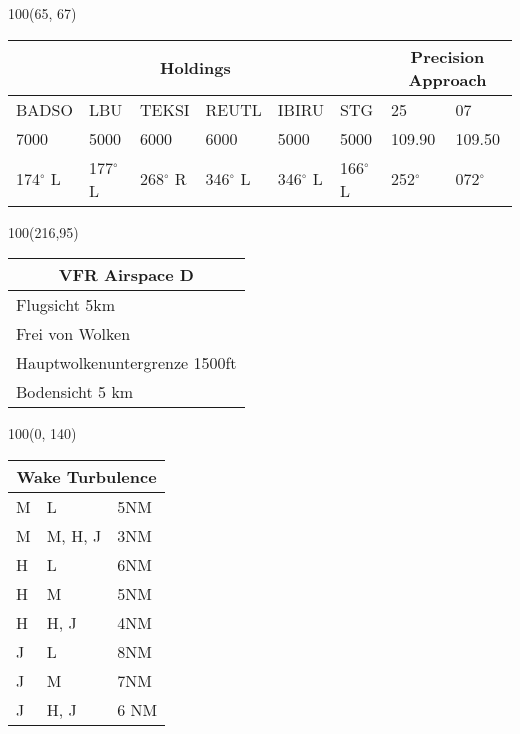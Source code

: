 \documentclass[10pt,landscape,a4paper]{article}
\begin{document}
\begin{textblock}{100}(65, 67)
\begin{table}[]
\begin{tabular}{llllllll} 
\multicolumn{6}{c}{\textbf{Holdings}}         & \multicolumn{2}{c}{\textbf{Precision Approach}}  \\ \hline
\multicolumn{1}{|l|}{BADSO} & 
\multicolumn{1}{l|}{LBU}   & 
\multicolumn{1}{l|}{TEKSI} & 
\multicolumn{1}{l|}{REUTL} &
\multicolumn{1}{l|}{IBIRU} &
\multicolumn{1}{l|}{STG} &
\multicolumn{1}{l|}{25} &
\multicolumn{1}{l|}{07} \\ \hline
\multicolumn{1}{|l|}{7000} & 
\multicolumn{1}{l|}{5000} & 
\multicolumn{1}{l|}{6000} & 
\multicolumn{1}{l|}{6000} &
\multicolumn{1}{l|}{5000} &
\multicolumn{1}{l|}{5000} & 
\multicolumn{1}{l|}{109.90} & 
\multicolumn{1}{l|}{109.50} \\ \hline
\multicolumn{1}{|l|}{174$^\circ$ L} & 
\multicolumn{1}{l|}{177$^\circ$ L} & 
\multicolumn{1}{l|}{268$^\circ$ R} & 
\multicolumn{1}{l|}{346$^\circ$ L} &
\multicolumn{1}{l|}{346$^\circ$ L} &
\multicolumn{1}{l|}{166$^\circ$ L} &
 \multicolumn{1}{l|}{252$^\circ$} & 
 \multicolumn{1}{l|}{072$^\circ$}\\ \hline
\end{tabular}
\end{table}
\end{textblock}

\begin{textblock}{100}(216,95)
\begin{table}[]
\begin{tabular}{|l|}
\multicolumn{1}{c}{\textbf{VFR Airspace D}} \\ \hline
 Flugsicht 5km   \\ \hline
Frei von Wolken   \\ \hline
Hauptwolkenuntergrenze 1500ft \\ \hline
Bodensicht 5 km \\ \hline
\end{tabular}
\end{table}
\end{textblock}

\begin{textblock}{100}(0, 140)
\begin{table}[]
\begin{tabular}{|l|l|l|}
\multicolumn{3}{c}{\textbf{Wake Turbulence}} \\ \hline
 M  & L  & 5NM   \\ \hline
 M  & M, H, J  & 3NM   \\ \hline
 H  & L & 6NM   \\ \hline
 H  & M & 5NM   \\ \hline
 H  & H, J & 4NM \\ \hline
 J &  L & 8NM \\ \hline
 J &  M & 7NM \\ \hline
 J &  H, J  & 6 NM   \\ \hline
\end{tabular}
\end{table}
\end{textblock}
\end{document}
